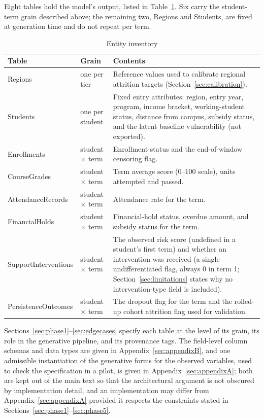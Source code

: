 \documentclass[11pt]{article}
\begin{document}
Eight tables hold the model's output, listed in Table~\ref{tab:entities}. Six carry the student-term grain described above; the remaining two, Regions and Students, are fixed at generation time and do not repeat per term.

\begin{table}[htbp]
\caption{Entity inventory}
\label{tab:entities}
\centering
\small
\renewcommand{\arraystretch}{1.2}
\begin{tabular}{@{}p{}p{}p{}@{}}
\toprule
\textbf{Table} & \textbf{Grain} & \textbf{Contents} \\
\midrule
Regions & one per tier & Reference values used to calibrate regional attrition targets (Section~\ref{sec:calibration}). \\
\addlinespace
Students & one per student & Fixed entry attributes: region, entry year, program, income bracket, working-student status, distance from campus, subsidy status, and the latent baseline vulnerability (not exported). \\
\addlinespace
Enrollments & student $\times$ term & Enrollment status and the end-of-window censoring flag. \\
\addlinespace
CourseGrades & student $\times$ term & Term average score (0--100 scale), units attempted and passed. \\
\addlinespace
AttendanceRecords & student $\times$ term & Attendance rate for the term. \\
\addlinespace
FinancialHolds & student $\times$ term & Financial-hold status, overdue amount, and subsidy status for the term. \\
\addlinespace
SupportInterventions & student $\times$ term & The observed risk score (undefined in a student's first term) and whether an intervention was received (a single undifferentiated flag, always 0 in term 1; Section~\ref{sec:limitations} states why no intervention-type field is included). \\
\addlinespace
PersistenceOutcomes & student $\times$ term & The dropout flag for the term and the rolled-up cohort attrition flag used for validation. \\
\bottomrule
\end{tabular}
\end{table}

Sections~\ref{sec:phase1}--\ref{sec:edgecases} specify each table at the level of its grain, its role in the generative pipeline, and its provenance tags. The field-level column schemas and data types are given in Appendix~\ref{sec:appendixB}, and one admissible instantiation of the generative forms for the observed variables, used to check the specification in a pilot, is given in Appendix~\ref{sec:appendixA}; both are kept out of the main text so that the architectural argument is not obscured by implementation detail, and an implementation may differ from Appendix~\ref{sec:appendixA} provided it respects the constraints stated in Sections~\ref{sec:phase1}--\ref{sec:phase5}.
\end{document}

